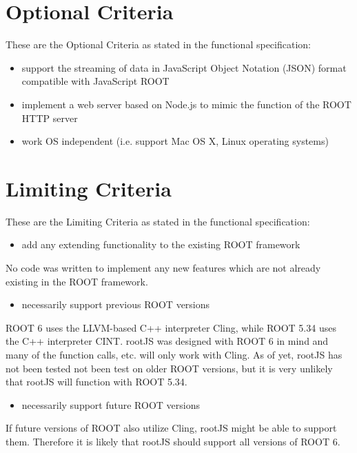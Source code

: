 \section{Optional Criteria}
These are the Optional Criteria as stated in the functional specification:
\begin{itemize}
	\item support the streaming of data in JavaScript Object Notation (JSON) format compatible with JavaScript ROOT
\end{itemize}


\begin{itemize}
	\item implement a web server based on Node.js to mimic the function of the ROOT HTTP server
\end{itemize}


\begin{itemize}
	\item work OS independent (i.e. support Mac OS X, Linux operating systems)
\end{itemize}

\section{Limiting Criteria}
These are the Limiting Criteria as stated in the functional specification:
\begin{itemize}
	\item add any extending functionality to the existing ROOT framework
\end{itemize}
No code was written to implement any new features which are not already existing in the ROOT framework. 

\begin{itemize}
	\item necessarily support previous ROOT versions
\end{itemize}
ROOT 6 uses the LLVM-based C++ interpreter Cling, while ROOT 5.34 uses the C++ interpreter CINT. 
rootJS was designed with ROOT 6 in mind and many of the function calls, etc. will only work with Cling. 
As of yet, rootJS has not been tested not been test on older ROOT versions, but it is very unlikely that rootJS will function with ROOT 5.34.

\begin{itemize}
	\item necessarily support future ROOT versions
\end{itemize}
If future versions of ROOT also utilize Cling, rootJS might be able to support them. Therefore it is likely that rootJS should support all versions of ROOT 6.

